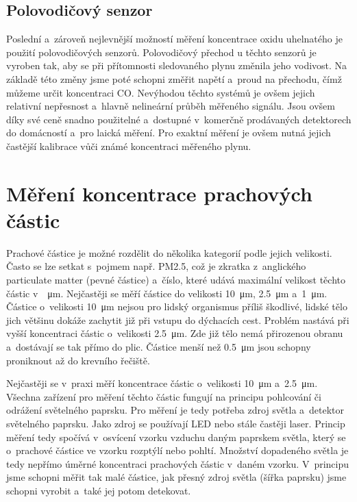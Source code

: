 \subsection{Polovodičový senzor}

Poslední a~zároveň nejlevnější možností měření koncentrace oxidu uhelnatého je použití polovodičových senzorů. Polovodičový přechod u těchto senzorů je vyroben tak, aby se při přítomnosti sledovaného plynu změnila jeho vodivost. Na základě této změny jsme poté schopni změřit napětí a~proud na přechodu, čímž můžeme určit koncentraci CO. Nevýhodou těchto systémů je ovšem jejich relativní nepřesnost a~hlavně nelineární průběh měřeného signálu. Jsou ovšem díky své ceně snadno použitelné a~dostupné v~komerčně prodávaných detektorech do domácností a~pro laická měření. Pro exaktní měření je ovšem nutná jejich častější kalibrace vůči známé koncentraci měřeného plynu.

\section{Měření koncentrace prachových částic}

Prachové částice je možné rozdělit do několika kategorií podle jejich velikosti. Často se lze setkat s~pojmem např. PM2.5, což je zkratka z~anglického particulate matter (pevné částice) a~číslo, které udává maximální velikost těchto částic v~\SI{}{\micro\metre}. Nejčastěji se měří částice do velikosti \SI{10}{\micro\metre}, \SI{2,5}{\micro\metre} a~\SI{1}{\micro\metre}. Částice o~velikosti \SI{10}{\micro\metre} nejsou pro lidský organismus příliš škodlivé, lidské tělo jich většinu dokáže zachytit již při vstupu do dýchacích cest. Problém nastává při vyšší koncentraci částic o~velikosti \SI{2,5}{\micro\metre}. Zde již tělo nemá přirozenou obranu a~dostávají se tak přímo do plic. Částice menší než \SI{0,5}{\micro\metre} jsou schopny proniknout až do krevního řečiště.

Nejčastěji se v~praxi měří koncentrace částic o~velikosti \SI{10}{\micro\metre} a~\SI{2,5}{\micro\metre}. Všechna zařízení pro měření těchto částic fungují na principu pohlcování či odrážení světelného paprsku. Pro měření je tedy potřeba zdroj světla a~detektor světelného paprsku. Jako zdroj se používají LED nebo stále častěji laser. Princip měření tedy spočívá v~osvícení vzorku vzduchu daným paprskem světla, který se o~prachové částice ve vzorku rozptýlí nebo pohltí. Množství dopadeného světla je tedy nepřímo úměrné koncentraci prachových částic v~daném vzorku. V~principu jsme schopni měřit tak malé částice, jak přesný zdroj světla (šířka paprsku) jsme schopni vyrobit a~také jej potom detekovat.

